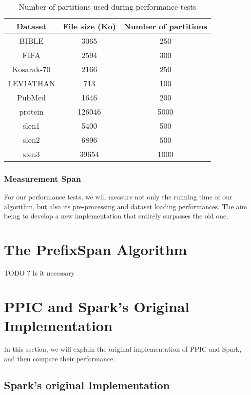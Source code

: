 \documentclass{eplmastersthesis}
\begin{document}
\begin{table}[h]
  \centering
  \begin{tabular}{| c | c | c |}
  	\hline
  	Dataset & File size (Ko) & Number of partitions \\
  	\hline
  	BIBLE & 3065 & 250 \\
  	\hline
  	FIFA & 2594 &300\\
  	\hline
  	Kosarak-70 & 2166 & 250\\
  	\hline  
  	LEVIATHAN & 713 & 100\\
  	\hline
  	PubMed & 1646 & 200\\
  	\hline
  	protein & 126046 & 5000\\
  	\hline
  	slen1 & 5400 & 500\\
 	\hline 
  	slen2 & 6896 & 500\\
  	\hline
  	slen3 & 39654 & 1000\\
  	\hline
  \end{tabular}
  \caption{Number of partitions used during performance tests}
  \label{tab:numPartitions}
\end{table}

\subsubsection{Measurement Span}

For our performance tests, we will measure not only the running time of our algorithm, but also its pre-processing and dataset loading performances. The aim being to develop a new implementation that entirely surpasses the old one. \newline

\section{The PrefixSpan Algorithm}

TODO ? Is it necessary

\section{PPIC and Spark's Original Implementation}

In this section, we will explain the original implementation of PPIC and Spark, and then compare their performance.

\subsection{Spark's original Implementation}
\end{document}
